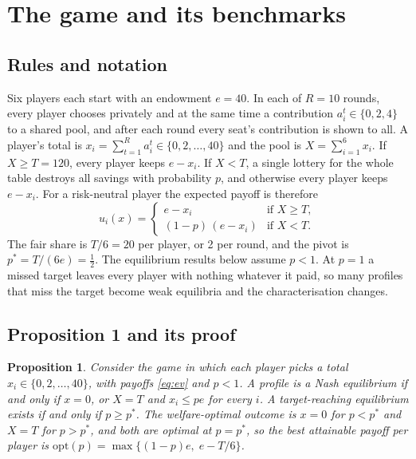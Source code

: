 \documentclass[10pt]{article}
\let\plainsubsection\subsection
\renewcommand{\subsection}{\FloatBarrier\needspace{8\baselineskip}\plainsubsection}
\let\plainsection\section
\renewcommand{\section}{\FloatBarrier\needspace{12\baselineskip}\plainsection}  %
\newtheorem{proposition}{Proposition}
\newcommand{\popt}{p^{*}}
\begin{document}
\section{The game and its benchmarks}
\label{sec:game}

\subsection{Rules and notation}

Six players each start with an endowment $e=40$. In each of $R=10$ rounds, every player chooses privately and at the same time a contribution $a_i^t\in\{0,2,4\}$ to a shared pool, and after each round every seat's contribution is shown to all. A player's total is $x_i=\sum_{t=1}^{R}a_i^t\in\{0,2,\dots,40\}$ and the pool is $X=\sum_{i=1}^{6}x_i$. If $X\ge T=120$, every player keeps $e-x_i$. If $X<T$, a single lottery for the whole table destroys all savings with probability $p$, and otherwise every player keeps $e-x_i$. For a risk-neutral player the expected payoff is therefore
\begin{equation}
\label{eq:ev}
u_i(x)=\begin{cases} e-x_i & \text{if } X\ge T,\\ (1-p)\,(e-x_i) & \text{if } X<T.\end{cases}
\end{equation}
The fair share is $T/6=20$ per player, or 2 per round, and the pivot is $\popt=T/(6e)=\tfrac12$. The equilibrium results below assume $p<1$. At $p=1$ a missed target leaves every player with nothing whatever it paid, so many profiles that miss the target become weak equilibria and the characterisation changes.

\subsection{Proposition 1 and its proof}

\begin{proposition}
Consider the game in which each player picks a total $x_i\in\{0,2,\dots,40\}$, with payoffs \eqref{eq:ev} and $p<1$. A profile is a Nash equilibrium if and only if $x=0$, or $X=T$ and $x_i\le pe$ for every $i$. A target-reaching equilibrium exists if and only if $p\ge\popt$. The welfare-optimal outcome is $x=0$ for $p<\popt$ and $X=T$ for $p>\popt$, and both are optimal at $p=\popt$, so the best attainable payoff per player is $\mathrm{opt}(p)=\max\{(1-p)e,\;e-T/6\}$.
\end{proposition}
\end{document}
